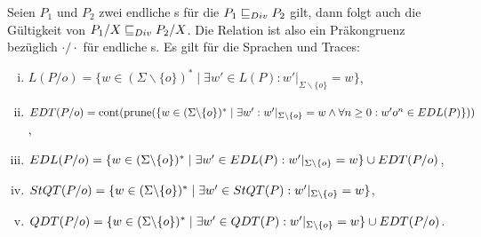 \begin{Satz}
  \label{DivHidingSatz}
  Seien $P_1$ und $P_2$ zwei endliche \MEIO{}s für die $P_1 \sqsubseteq  _{Div} P_2$ gilt,
  dann folgt auch die Gültigkeit von $P_1/X \sqsubseteq  _{Div} P_2/X$. Die Relation \DRel{}
  ist also ein Präkongruenz bezüglich $\cdot /\cdot$ für endliche \MEIO{}s. Es
  gilt für die Sprachen und Traces:
  \begin{enumerate}[(i)]
    \item $L(P/o) = \{w\in (\Sigma\backslash \{o\})^*\mid \exists w'\in L(P):
      w'|_{\Sigma\backslash \{o\}} = w\}$,
    \item $EDT (P/o) = \mathrm{cont} (\mathrm{prune} (\{w\in (\Sigma\backslash \{o\})^*\mid
      \exists w':w'|_{\Sigma\backslash \{o\}} = w\land \forall n\geq 0:
      w'o^n\in EDL (P)\}))$,
    \item $EDL (P/o) = \{w\in (\Sigma\backslash \{o\})^*\mid \exists w'\in
      EDL(P): w'|_{\Sigma\backslash \{o\}} = w\} \cup EDT (P/o)$,
    \item $StQT (P/o) = \{w\in (\Sigma\backslash \{o\})^*\mid \exists w'\in
      StQT(P): w'|_{\Sigma\backslash \{o\}} = w\}$,
    \item $QDT (P/o) = \{w\in (\Sigma\backslash \{o\})^*\mid \exists w'\in
      QDT(P): w'|_{\Sigma\backslash \{o\}} = w\} \cup EDT (P/o)$.
  \end{enumerate}
\end{Satz}
